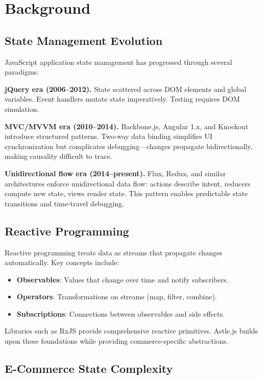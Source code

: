 \documentclass[11pt,twocolumn]{article}
\begin{document}
\section{Background}

\subsection{State Management Evolution}

JavaScript application state management has progressed through several paradigms:

\textbf{jQuery era (2006--2012).} State scattered across DOM elements and global variables. Event handlers mutate state imperatively. Testing requires DOM simulation.

\textbf{MVC/MVVM era (2010--2014).} Backbone.js, Angular 1.x, and Knockout introduce structured patterns. Two-way data binding simplifies UI synchronization but complicates debugging—changes propagate bidirectionally, making causality difficult to trace.

\textbf{Unidirectional flow era (2014--present).} Flux, Redux, and similar architectures enforce unidirectional data flow: actions describe intent, reducers compute new state, views render state. This pattern enables predictable state transitions and time-travel debugging.

\subsection{Reactive Programming}

Reactive programming treats data as streams that propagate changes automatically. Key concepts include:

\begin{itemize}
\item \textbf{Observables}: Values that change over time and notify subscribers.
\item \textbf{Operators}: Transformations on streams (map, filter, combine).
\item \textbf{Subscriptions}: Connections between observables and side effects.
\end{itemize}

Libraries such as RxJS \cite{rxjs2015} provide comprehensive reactive primitives. Astle.js builds upon these foundations while providing commerce-specific abstractions.

\subsection{E-Commerce State Complexity}
\end{document}
